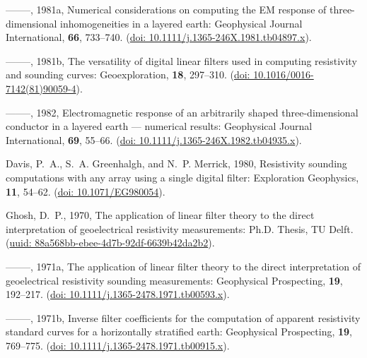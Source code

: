 \documentclass[paper,twocolumn,twoside]{geophysics}
\begin{document}
\begin{thebibliography}{}
--------, 1981a, Numerical considerations on computing the {EM} response of
  three-dimensional inhomogeneities in a layered earth: Geophysical Journal
  International, {\bf 66}, 733--740.
\newblock (\href{https://doi.org/10.1111/j.1365-246X.1981.tb04897.x}{doi:
  10.1111/j.1365-246X.1981.tb04897.x}).

--------, 1981b, The versatility of digital linear filters used in computing
resistivity and  sounding curves: Geoexploration, {\bf 18},
297--310. \newblock (\href{https://doi.org/10.1016/0016-7142(81)90059-4}{doi:
10.1016/0016-7142(81)90059-4}).

--------, 1982, Electromagnetic response of an arbitrarily shaped
  three-dimensional conductor in a layered earth — numerical results:
  Geophysical Journal International, {\bf 69}, 55--66.
\newblock (\href{https://doi.org/10.1111/j.1365-246X.1982.tb04935.x}{doi:
  10.1111/j.1365-246X.1982.tb04935.x}).

Davis, P.~A., S.~A. Greenhalgh, and N.~P. Merrick,  1980, Resistivity sounding
  computations with any array using a single digital filter: Exploration
  Geophysics, {\bf 11}, 54--62.
\newblock (\href{https://doi.org/10.1071/EG980054}{doi: 10.1071/EG980054}).

Ghosh, D.~P.,  1970, The application of linear filter theory to the direct
  interpretation of geoelectrical resistivity measurements: {Ph.D. Thesis}, {TU
  Delft}.
\newblock
  (\href{http://resolver.tudelft.nl/uuid:88a568bb-ebee-4d7b-92df-6639b42da2b2}{uuid:
  88a568bb-ebee-4d7b-92df-6639b42da2b2}).

--------, 1971a, The application of linear filter theory to the direct
  interpretation of geoelectrical resistivity sounding measurements:
  Geophysical Prospecting, {\bf 19}, 192--217.
\newblock (\href{https://doi.org/10.1111/j.1365-2478.1971.tb00593.x}{doi:
  10.1111/j.1365-2478.1971.tb00593.x}).

--------, 1971b, Inverse filter coefficients for the computation of apparent
  resistivity standard curves for a horizontally stratified earth: Geophysical
  Prospecting, {\bf 19}, 769--775.
\newblock (\href{https://doi.org/10.1111/j.1365-2478.1971.tb00915.x}{doi:
  10.1111/j.1365-2478.1971.tb00915.x}).


\end{thebibliography}
\end{document}
